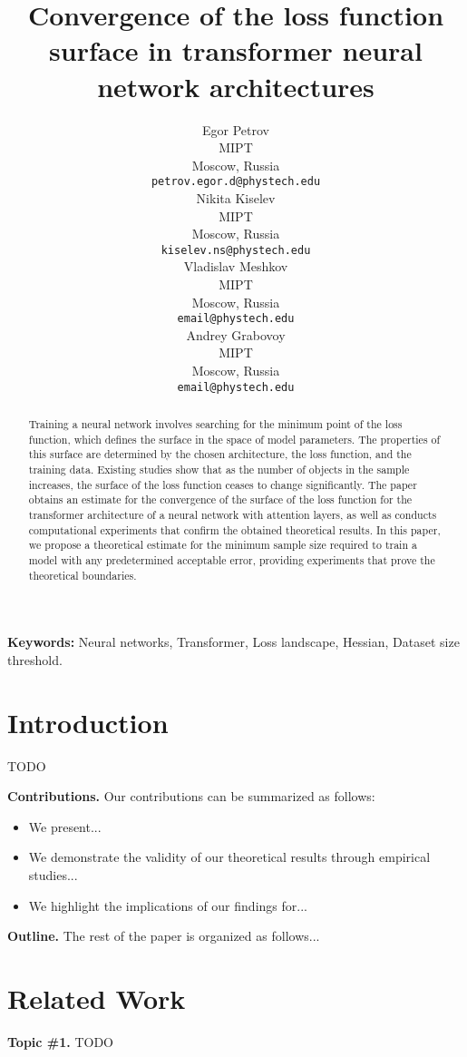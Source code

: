 \documentclass{article}
\title{Convergence of the loss function surface in transformer neural network architectures}
\author{
  Egor Petrov\\
  MIPT\\
  Moscow, Russia\\
  \texttt{petrov.egor.d@phystech.edu}\\
  \And
  Nikita Kiselev\\
  MIPT\\
  Moscow, Russia\\
  \texttt{kiselev.ns@phystech.edu}\\
  \And
  Vladislav Meshkov\\
  MIPT\\
  Moscow, Russia\\
  \texttt{email@phystech.edu}\\
  \And
  Andrey Grabovoy\\
  MIPT\\
  Moscow, Russia\\
  \texttt{email@phystech.edu}\\
}
\begin{document}
\maketitle

\begin{abstract}
    Training a neural network involves searching for the minimum point of the loss function, which defines the surface in the space of model parameters. 
    The properties of this surface are determined by the chosen architecture, the loss function, and the training data. 
    Existing studies show that as the number of objects in the sample increases, the surface of the loss function ceases to change significantly. 
    The paper obtains an estimate for the convergence of the surface of the loss function for the transformer architecture of a neural network with attention layers, as well as conducts computational experiments that confirm the obtained theoretical results. 
    In this paper, we propose a theoretical estimate for the minimum sample size required to train a model with any predetermined acceptable error, providing experiments that prove the theoretical boundaries.
\end{abstract}

\textbf{Keywords:} Neural networks, Transformer, Loss landscape, Hessian, Dataset size threshold.

\section{Introduction}\label{sec:intro}

TODO

\textbf{Contributions.} Our contributions can be summarized as follows:
\begin{itemize}
    \item We present...
    \item We demonstrate the validity of our theoretical results through empirical studies...
    \item We highlight the implications of our findings for...
\end{itemize}

\textbf{Outline.} The rest of the paper is organized as follows...

\section{Related Work}\label{sec:rw}

\textbf{Topic \#1.}
TODO
\end{document}
